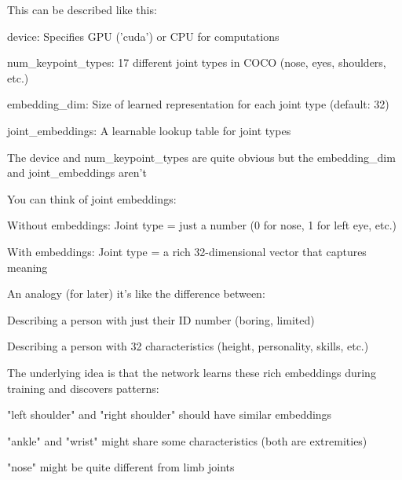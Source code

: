 This can be described like this:

\begin{compactitem}
   \item device: Specifies GPU ('cuda') or CPU for computations
   \item num\_keypoint\_types: 17 different joint types in COCO (nose, eyes, shoulders, etc.)
   \item embedding\_dim: Size of learned representation for each joint type (default: 32)
   \item joint\_embeddings: A learnable lookup table for joint types
\end{compactitem}


The device and num\_keypoint\_types are quite obvious but the embedding\_dim and joint\_embeddings aren't

You can think of joint embeddings:

\begin{compactitem}
   \item Without embeddings: Joint type = just a number (0 for nose, 1 for left eye, etc.)
   \item With embeddings: Joint type = a rich 32-dimensional vector that captures meaning
\end{compactitem}


An analogy (for later) it's like the difference between:

\begin{compactitem}
   \item Describing a person with just their ID number (boring, limited)
   \item Describing a person with 32 characteristics (height, personality, skills, etc.)
\end{compactitem}

The underlying idea is that the network learns these rich embeddings during training and discovers patterns:
\begin{compactitem}
   \item "left shoulder" and "right shoulder" should have similar embeddings
   \item "ankle" and "wrist" might share some characteristics (both are extremities)
   \item "nose" might be quite different from limb joints
\end{compactitem}

